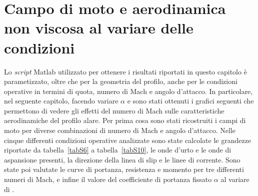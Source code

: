 
\chapter{Campo di moto e aerodinamica non viscosa al variare delle condizioni}
Lo {\itshape script} Matlab utilizzato per ottenere i risultati riportati in questo capitolo è parametizzato, oltre che per la geometria del profilo, anche per le condizioni operative in termini di quota, numero di Mach e angolo d'attacco. In particolare, nel seguente capitolo, facendo variare $\alpha$ e \Minf sono stati ottenuti i grafici seguenti che permettono di vedere gli effetti del numero di Mach sulle caratteristiche aerodinamiche del profilo alare.
Per prima cosa sono stati ricostruiti i campi di moto per diverse combinazioni di numero di Mach e angolo d'attacco. Nelle cinque differenti condizioni operative analizzate sono state calcolate le grandezze riportate da tabella~\ref{tabS6} a tabella~\vref{tabS10}, le onde d'urto e le onde di aspansione presenti, la direzione della linea di slip e le linee di corrente. Sono state poi valutate le curve di portanza, resistenza e momento per tre differenti numeri di Mach, e infine il valore del coefficiente di portanza fissato $\alpha$ al variare di \Minf.



